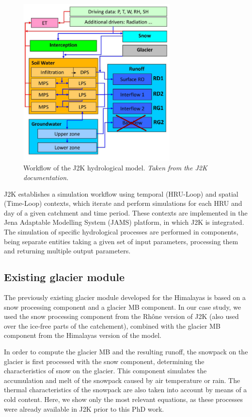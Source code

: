 \begin{figure}[h]
\centering
\includegraphics[width=8cm]{Figures/hydro/Figure_1.png}
\caption{Workflow of the J2K hydrological model. \textit{Taken from the J2K documentation.}} 
\label{hydro:fig1}
\end{figure}

J2K establishes a simulation workflow using temporal (HRU-Loop) and spatial (Time-Loop) contexts, which iterate and perform simulations for each HRU and day of a given catchment and time period. These contexts are implemented in the Jena Adaptable Modelling System (JAMS) platform, in which J2K is integrated. The simulation of specific hydrological processes are performed in components, being separate entities taking a given set of input parameters, processing them and returning multiple output parameters. 

\subsection{Existing glacier module}

The previously existing glacier module developed for the Himalayas is based on a snow processing component and a glacier MB component. In our case study, we used the snow processing component from the Rhône version of J2K (also used over the ice-free parts of the catchement), combined with the glacier MB component from the Himalayas version of the model.

In order to compute the glacier MB and the resulting runoff, the snowpack on the glacier is first processed with the snow component, determining the characteristics of snow on the glacier. This component simulates the accumulation and melt of the snowpack caused by air temperature or rain. The thermal characteristics of the snowpack are also taken into account by means of a cold content. Here, we show only the most relevant equations, as these processes were already available in J2K prior to this PhD work.

